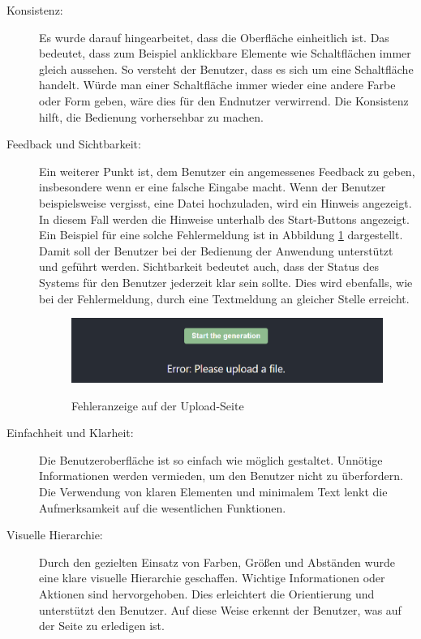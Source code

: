 \begin{description}
    \item[Konsistenz:] Es wurde darauf hingearbeitet, dass die Oberfläche einheitlich ist. Das bedeutet, dass zum Beispiel anklickbare Elemente wie Schaltflächen immer gleich aussehen. So versteht der Benutzer, dass es sich um eine Schaltfläche handelt. Würde man einer Schaltfläche immer wieder eine andere Farbe oder Form geben, wäre dies für den Endnutzer verwirrend. Die Konsistenz hilft, die Bedienung vorhersehbar zu machen.
    
    \item[Feedback und Sichtbarkeit:] Ein weiterer Punkt ist, dem Benutzer ein angemessenes Feedback zu geben, insbesondere wenn er eine falsche Eingabe macht. Wenn der Benutzer beispielsweise vergisst, eine Datei hochzuladen, wird ein Hinweis angezeigt. In diesem Fall werden die Hinweise unterhalb des Start-Buttons angezeigt. Ein Beispiel für eine solche Fehlermeldung ist in Abbildung \ref{fig:Fehleranzeige_Upload} dargestellt. Damit soll der Benutzer bei der Bedienung der Anwendung unterstützt und geführt werden. Sichtbarkeit bedeutet auch, dass der Status des Systems für den Benutzer jederzeit klar sein sollte. Dies wird ebenfalls, wie bei der Fehlermeldung, durch eine Textmeldung an gleicher Stelle erreicht.

    \begin{figure}[H]
    \centering
    \includegraphics[width=0.8\linewidth]{Images/Frontend_Fehler.png}\\
    \caption{Fehleranzeige auf der Upload-Seite}
    \label{fig:Fehleranzeige_Upload}
    \end{figure}

    \item[Einfachheit und Klarheit:] Die Benutzeroberfläche ist so einfach wie möglich gestaltet. Unnötige Informationen werden vermieden, um den Benutzer nicht zu überfordern. Die Verwendung von klaren Elementen und minimalem Text lenkt die Aufmerksamkeit auf die wesentlichen Funktionen.

    \item[Visuelle Hierarchie:] Durch den gezielten Einsatz von Farben, Größen und Abständen wurde eine klare visuelle Hierarchie geschaffen. Wichtige Informationen oder Aktionen sind hervorgehoben. Dies erleichtert die Orientierung und unterstützt den Benutzer. Auf diese Weise erkennt der Benutzer, was auf der Seite zu erledigen ist. 
\end{description}

